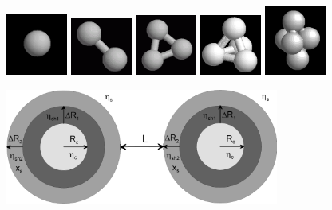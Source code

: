 \begin{figure}[htb]
\begin{center}
\includegraphics[width=0.18\textwidth,height=0.18\textwidth]{../images/form_factor/cluster/tetrahedron1.png}
\includegraphics[width=0.18\textwidth,height=0.18\textwidth]{../images/form_factor/cluster/tetrahedron2.png}
\includegraphics[width=0.18\textwidth,height=0.18\textwidth]{../images/form_factor/cluster/tetrahedron3.png}
\includegraphics[width=0.18\textwidth,height=0.18\textwidth]{../images/form_factor/cluster/tetrahedron4.png}
\includegraphics[width=0.18\textwidth,height=0.18\textwidth]{../images/form_factor/cluster/tetrahedron5.png}
\end{center}
\caption{} \label{tetrahedron}
\end{figure}
\begin{figure}[htb]
\begin{center}
\includegraphics[width=0.8\textwidth,height=0.337\textwidth]{../images/form_factor/cluster/l_doubleshell.png}
\end{center}
\caption{}
\label{TetrahedronDoubleShell}
\end{figure}

